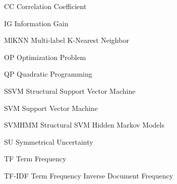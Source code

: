 \newcommand{\abbrlabel}[1]{\makebox[3cm][l]{\textbf{#1}}}
\newenvironment{abbreviations}{\begin{list}{}{\renewcommand{\makelabel}{\abbrlabel}}}{\end{list}}
\begin{abbreviations}
	\item[CC] Correlation Coefficient
	\item[IG] Information Gain
	\item[MlKNN] Multi-label K-Nearest Neighbor
	\item[OP] Optimization Problem
	\item[QP] Quadratic Programming
	\item[SSVM] Structural Support Vector Machine	
	\item[SVM] Support Vector Machine
	\item[SVMHMM] Structural SVM Hidden Markov Models
	\item[SU] Symmetrical Uncertainty
	\item[TF] Term Frequency
	\item[TF-IDF] Term Frequency Inverse Document Frequency
\end{abbreviations}